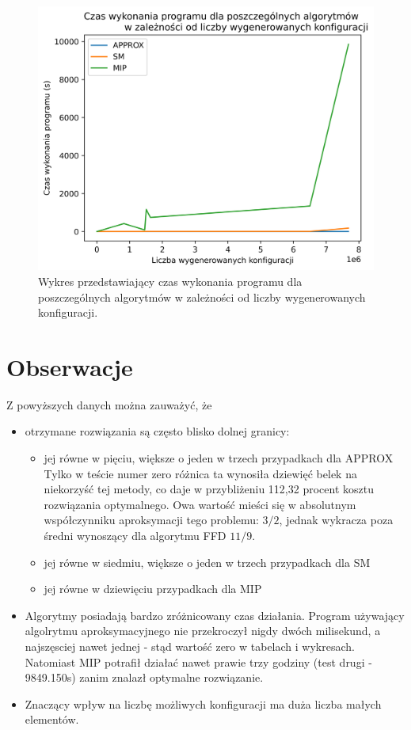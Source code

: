 \begin{figure}[H]
	\begin{center}
		\includegraphics[width=12cm]{plots/time_configs}
		\caption{Wykres przedstawiający czas wykonania programu dla poszczególnych algorytmów w zależności od liczby wygenerowanych konfiguracji.}
	\end{center}
\end{figure}

\newpage
\section{Obserwacje}

Z powyższych danych można zauważyć, że
\begin{itemize}
	\item otrzymane rozwiązania są często blisko dolnej granicy:
	\begin{itemize}
		\item jej równe w pięciu, większe o jeden w trzech przypadkach dla APPROX \\
		Tylko w teście numer zero różnica ta wynosiła dziewięć belek na niekorzyść tej metody, co daje w przybliżeniu 112,32 procent kosztu rozwiązania optymalnego. Owa wartość mieści się w absolutnym współczynniku aproksymacji tego problemu: $3/2$, jednak wykracza poza średni wynoszący dla algorytmu FFD $11/9$.
		\item jej równe w siedmiu, większe o jeden w trzech przypadkach dla SM
		\item jej równe w dziewięciu przypadkach dla MIP
	\end{itemize}
	\item Algorytmy posiadają bardzo zróżnicowany czas działania.
	Program używający algolrytmu aproksymacyjnego nie przekroczył nigdy dwóch milisekund, a najszęsciej nawet jednej - stąd wartość zero w tabelach i wykresach. Natomiast MIP potrafił działać nawet prawie trzy godziny (test drugi - 9849.150s) zanim znalazł optymalne rozwiązanie. 
	\item Znaczący wpływ na liczbę możliwych konfiguracji ma duża liczba małych elementów.
	
\end{itemize}

